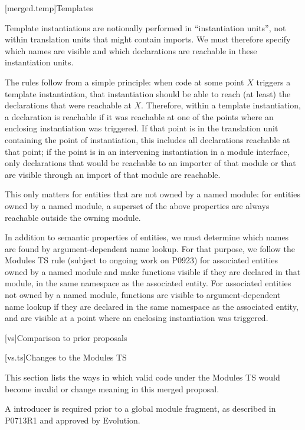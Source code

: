 [merged.temp]{Templates}

\pnum
Template instantiations are notionally performed in ``instantiation units'',
not within translation units that might contain imports.
We must therefore specify
which names are visible and
which declarations are reachable
in these instantiation units.

\pnum
The rules follow from a simple principle:
when code at some point $X$ triggers a template instantiation,
that instantiation should be able to reach (at least)
the declarations that were reachable at $X$.
Therefore, within a template instantiation,
a declaration is reachable if
it was reachable at one of the points where
an enclosing instantiation was triggered.
If that point is in the translation unit
containing the point of instantiation,
this includes all declarations reachable
at that point;
if the point is in an intervening instantiation
in a module interface,
only declarations that would be reachable
to an importer of that module
or that are visible through an import of that module
are reachable.
\begin{note}
This only matters for entities that are
not owned by a named module:
for entities owned by a named module,
a superset of the above properties
are always reachable outside the owning module.
\end{note}

\pnum
In addition to semantic properties of entities,
we must determine which names are found by
argument-dependent name lookup.
For that purpose,
we follow the Modules TS rule
(subject to ongoing work on P0923)
for associated entities owned by a named module
and make functions visible
if they are declared in that module,
in the same namespace as the associated entity.
For associated entities not owned by a named module,
functions are visible to
argument-dependent name lookup
if they are declared
in the same namespace as the associated entity,
and are visible at a point where
an enclosing instantiation
was triggered.

[vs]{Comparison to prior proposals}

[vs.ts]{Changes to the Modules TS}

\pnum
This section lists the ways in which valid code under the Modules TS
would become invalid or change meaning in this merged proposal.

\pnum
A  introducer is required prior to a global module fragment,
as described in P0713R1 and approved by Evolution.

